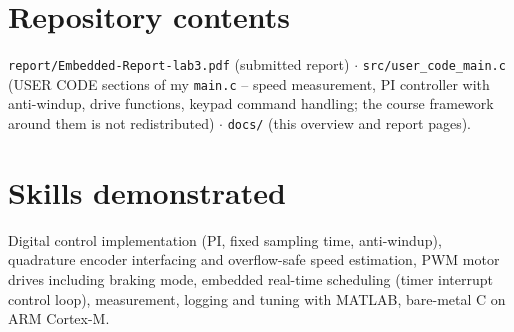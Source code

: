 \documentclass[10pt,a4paper]{article}
\begin{document}
\section*{Repository contents}
\texttt{report/Embedded-Report-lab3.pdf} (submitted report) $\cdot$ \texttt{src/user\_code\_main.c} (USER CODE
sections of my \texttt{main.c} -- speed measurement, PI controller with anti-windup, drive functions, keypad
command handling; the course framework around them is not redistributed) $\cdot$ \texttt{docs/} (this overview and
report pages).

\section*{Skills demonstrated}
Digital control implementation (PI, fixed sampling time, anti-windup), quadrature encoder interfacing and
overflow-safe speed estimation, PWM motor drives including braking mode, embedded real-time scheduling (timer
interrupt control loop), measurement, logging and tuning with MATLAB, bare-metal C on ARM Cortex-M.
\end{document}
